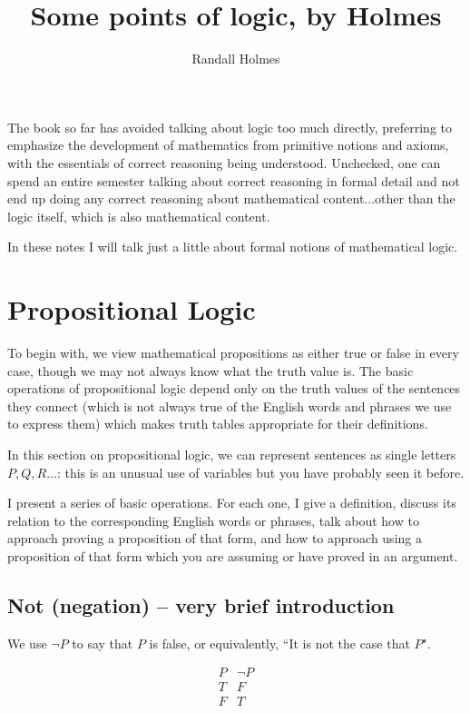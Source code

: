 \documentclass[12pt]{article}
\title{Some points of logic, by Holmes}
\author{Randall Holmes}
\begin{document}
\maketitle

The book so far has avoided talking about logic too much directly, preferring to emphasize the development of mathematics from primitive notions and axioms, with the essentials of correct reasoning being understood.  Unchecked, one can spend an entire semester talking about correct reasoning in formal detail and not end up doing any correct reasoning about mathematical content...other than the logic itself, which is also mathematical content.

In these notes I will talk just a little about formal notions of mathematical logic.

\section{Propositional Logic}

To begin with, we view mathematical propositions as either true or false in every case, though we may not always know what the truth value is.  The basic operations of propositional logic depend only on the truth values of the sentences they connect (which is not always true of the English words and phrases we use to express them) which makes truth tables appropriate for their definitions.

In this section on propositional logic, we can represent sentences as single letters $P,Q,R\ldots$:  this is an unusual use of variables but you have probably seen it before.

I present a series of basic operations.  For each one, I give a definition, discuss its relation to the corresponding English words or phrases, talk about how to approach proving a proposition of that form, and how to approach using a proposition of that form which you are assuming or have proved in an argument.

\subsection{Not (negation) -- very brief introduction}

We use $\neg P$ to say that $P$ is false, or equivalently, ``It is not the case that $P$".

$$\begin{array}{c|c}

P & \neg P \\ \hline
T & F \\
F & T \\
\end{array}$$
\end{document}
